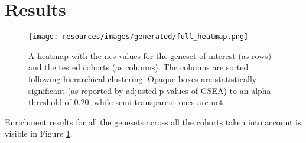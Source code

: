 \section{Results}

\begin{figure}
    \centering
    \texttt{[image: resources/images/generated/full\_heatmap.png]}
    \caption{A heatmap with the \gls{nes} values for the geneset of interest (as rows) and the tested cohorts (as columns). The columns are sorted following hierarchical clustering. Opaque boxes are statistically significant (as reported by adjusted p-values of GSEA) to an alpha threshold of $0.20$, while semi-transparent ones are not.}
    \label{fig:full_enrichment_heatmap}
\end{figure}

Enrichment results for all the genesets across all the cohorts taken into
account is visible in Figure \ref{fig:full_enrichment_heatmap}.
